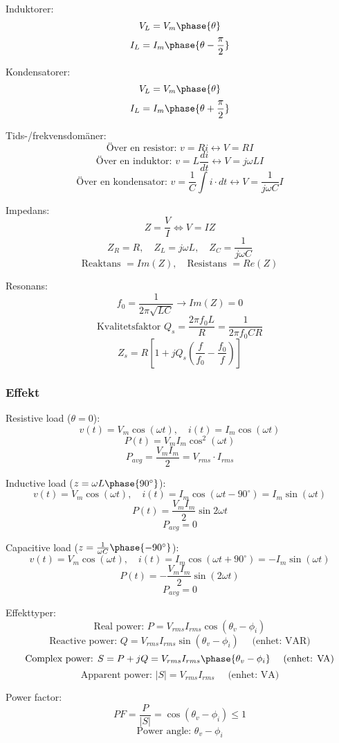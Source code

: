 \documentclass{article}
\begin{document}
Induktorer:
\[ V_L = V_m \phase{\theta} \]
\[ I_L = I_m \phase{\theta - \frac{\pi}{2}} \]

Kondensatorer:
\[ V_L = V_m \phase{\theta} \]
\[ I_L = I_m \phase{\theta + \frac{\pi}{2}} \]

Tids-/frekvensdomäner:
\[ \textrm{Över en resistor: } v = Ri \leftrightarrow V = RI \]
\[ \textrm{Över en induktor: } v = L \frac{di}{dt} \leftrightarrow V = j \omega LI \]
\[ \textrm{Över en kondensator: } v = \frac{1}{C} \int i \cdot dt \leftrightarrow V = \frac{1}{j \omega C}I \]

Impedans:
\[ Z = \frac{V}{I} \Leftrightarrow V = IZ \]
\[ Z_R = R, \quad Z_L = j \omega L, \quad Z_C = \frac{1}{j \omega C} \]
\[ \textrm{Reaktans } = Im(Z), \quad \textrm{Resistans } = Re(Z) \]

Resonans:
\[ f_0 = \frac{1}{2\pi \sqrt{LC}} \rightarrow Im(Z) = 0 \]
\[ \textrm{Kvalitetsfaktor } Q_s = \frac{2\pi f_0 L}{R} = \frac{1}{2\pi f_0 CR} \]
\[ Z_s = R \left[1 + j Q_s \left( \frac{f}{f_0} - \frac{f_0}{f} \right) \right] \]

\subsubsection{Effekt}

Resistive load (\(\theta = 0 \)):
\[ v(t) = V_m \cos(\omega t), \quad i(t) = I_m \cos(\omega t) \]
\[ P(t) = V_m I_m \cos^2(\omega t) \]
\[ P_{avg} = \frac{V_m I_m}{2} = V_{rms} \cdot I_{rms} \]

Inductive load (\(z = \omega L \phase{90^\circ} \)):
\[ v(t) = V_m \cos(\omega t), \quad i(t) = I_m \cos(\omega t - 90^\circ) = I_m \sin(\omega t) \]
\[ P(t) = \frac{V_m I_m}{2} \sin{2\omega t} \]
\[ P_{avg} = 0 \]

Capacitive load (\(z = \frac{1}{\omega C} \phase{-90^\circ} \)):
\[ v(t) = V_m \cos(\omega t), \quad i(t) = I_m\cos(\omega t + 90^\circ) = -I_m \sin(\omega t) \]
\[ P(t) = -\frac{V_m I_m}{2} \sin(2 \omega t) \]
\[ P_{avg} = 0 \] 

Effekttyper:
\[ \textrm{Real power: } P = V_{rms} I_{rms} \cos(\theta_v - \phi_i) \]
\[ \textrm{Reactive power: } Q = V_{rms} I_{rms}\sin(\theta_v - \phi_i) \quad \textrm{ (enhet: VAR)}\]
\[ \textrm{Complex power: } S = P + jQ = V_{rms}I_{rms}\phase{\theta_v - \phi_i} \quad \textrm{ (enhet: VA)} \]
\[ \textrm{Apparent power: } |S| = V_{rms}I_{rms} \quad \textrm{ (enhet: VA)} \]

Power factor:
\[ PF = \frac{P}{|S|} = \cos(\theta_v - \phi_i) \leq 1 \]
\[ \textrm{Power angle: } \theta_v - \phi_i \]
\end{document}
